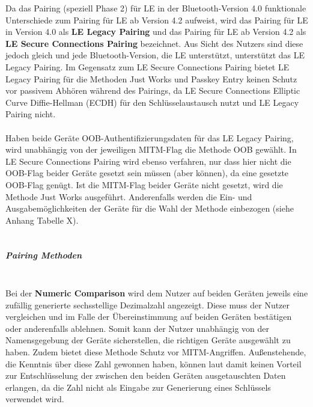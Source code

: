 Da das Pairing (speziell Phase 2) für LE in der Bluetooth-Version 4.0 funktionale Unterschiede zum Pairing für LE ab Version 4.2 aufweist, wird das Pairing für LE in Version 4.0 als \textbf{LE Legacy Pairing} und das Pairing für LE ab Version 4.2 als \textbf{LE Secure Connections Pairing} bezeichnet. Aus Sicht des Nutzers sind diese jedoch gleich und jede Bluetooth-Version, die LE unterstützt, unterstützt das LE Legacy Pairing. Im Gegensatz zum LE Secure Connections Pairing bietet LE Legacy Pairing für die Methoden Just Works und Passkey Entry keinen Schutz vor passivem Abhören während des Pairings, da LE Secure Connections Elliptic Curve Diffie-Hellman (ECDH) für den Schlüsselaustausch nutzt und LE Legacy Pairing nicht. \cite{BtSpec4.2_248}
\\\\
Haben beide Geräte OOB-Authentifizierungsdaten für das LE Legacy Pairing, wird unabhängig von der jeweiligen MITM-Flag die Methode OOB gewählt. In LE Secure Connections Pairing wird ebenso verfahren, nur dass hier nicht die OOB-Flag beider Geräte gesetzt sein müssen (aber können), da eine gesetzte OOB-Flag genügt. Ist die MITM-Flag beider Geräte nicht gesetzt, wird die Methode Just Works ausgeführt. Anderenfalls werden die Ein- und Ausgabemöglichkeiten der Geräte für die Wahl der Methode einbezogen (siehe Anhang Tabelle X).\\\\


\subparagraph{Pairing Methoden} \mbox{} \vspace{0.2cm} \\

Bei der \textbf{Numeric Comparison} wird dem Nutzer auf beiden Geräten jeweils eine zufällig generierte sechsstellige Dezimalzahl angezeigt. Diese muss der Nutzer vergleichen und im Falle der Übereinstimmung auf beiden Geräten bestätigen oder anderenfalls ablehnen. Somit kann der Nutzer unabhängig von der Namensgegebung der Geräte sicherstellen, die richtigen Geräte ausgewählt zu haben. Zudem bietet diese Methode Schutz vor MITM-Angriffen. Außenstehende, die Kenntnis über diese Zahl gewonnen haben, können laut \cite{BtSpec4.2_244-245} damit keinen Vorteil zur Entschlüsselung der zwischen den beiden Geräten ausgetauschten Daten erlangen, da die Zahl nicht als Eingabe zur Generierung eines Schlüssels verwendet wird.

